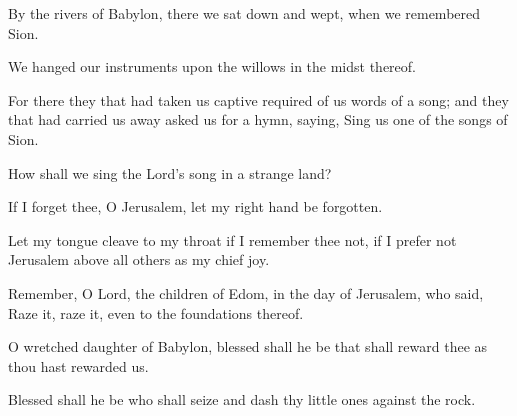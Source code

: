 By the rivers of Babylon, there we sat down and wept, when we remembered Sion.

We hanged our instruments upon the willows in the midst thereof.

For there they that had taken us captive required of us words of a song; and they that had carried us away asked us for a hymn, saying, Sing us one of the songs of Sion.

How shall we sing the Lord's song in a strange land?

If I forget thee, O Jerusalem, let my right hand be forgotten.

Let my tongue cleave to my throat if I remember thee not, if I prefer not Jerusalem above all others as my chief joy.

Remember, O Lord, the children of Edom, in the day of Jerusalem, who said, Raze it, raze it, even to the foundations thereof.

O wretched daughter of Babylon, blessed shall he be that shall reward thee as thou hast rewarded us.

Blessed shall he be who shall seize and dash thy little ones against the rock.
